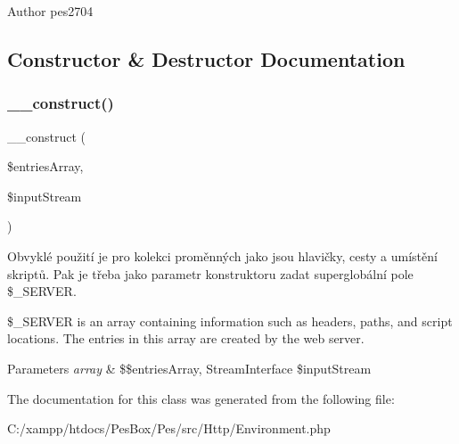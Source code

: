 \begin{DoxyAuthor}{Author}
pes2704 
\end{DoxyAuthor}


\subsection{Constructor \& Destructor Documentation}
\mbox{\label{class_pes_1_1_http_1_1_environment_a003d8d65127b3dabd465d292876bb5f9}} 
\subsubsection{\texorpdfstring{\+\_\+\+\_\+construct()}{\_\_construct()}}
{\footnotesize\ttfamily \+\_\+\+\_\+construct (\begin{DoxyParamCaption}\item[{}]{\$entries\+Array,  }\item[{}]{\$input\+Stream }\end{DoxyParamCaption})}

Obvyklé použití je pro kolekci proměnných jako jsou hlavičky, cesty a umístění skriptů. Pak je třeba jako parametr konstruktoru zadat superglobální pole \$\+\_\+\+S\+E\+R\+V\+ER.

\$\+\_\+\+S\+E\+R\+V\+ER is an array containing information such as headers, paths, and script locations. The entries in this array are created by the web server.


\begin{DoxyParams}{Parameters}
{\em array} & \$\$entries\+Array, Stream\+Interface \$input\+Stream \\
\hline
\end{DoxyParams}


The documentation for this class was generated from the following file\+:\begin{DoxyCompactItemize}
\item 
C\+:/xampp/htdocs/\+Pes\+Box/\+Pes/src/\+Http/Environment.\+php\end{DoxyCompactItemize}
